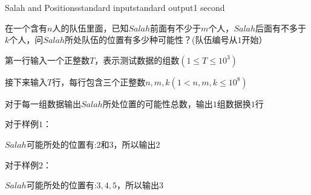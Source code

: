 \begin{problem}{Salah and Positions}{standard input}{standard output}{1 second}

在一个含有$n$人的队伍里面，已知$Salah$前面有不少于$m$个人，$Salah$后面有不多于$k$个人，问$Salah$所处队伍的位置有多少种可能性？(队伍编号从$1$开始）

\InputFile

第一行输入一个正整数$T$，表示测试数据的组数$(1\le T\le 10^3)$

接下来输入$T$行，每行包含三个正整数$n,m,k(1<n,m,k\le 10^8)$

\OutputFile

对于每一组数据输出$Salah$所处位置的可能性总数，输出$1$组数据换$1$行

\Example

\begin{example}
%
%
\end{example}

对于样例$1$：

$Salah$可能所处的位置有:$2$和$3$，所以输出$2$

对于样例$2$：

$Salah$可能所处的位置有:$3,4,5$，所以输出$3$

\end{problem}
